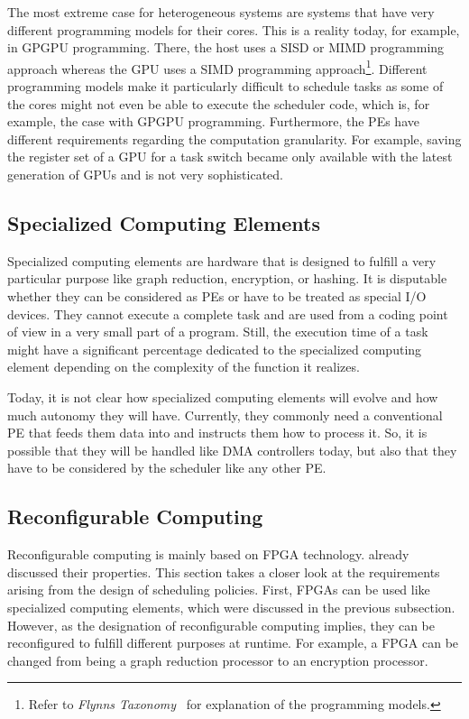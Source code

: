 The most extreme case for heterogeneous systems are systems that have very different programming models for their cores. This is a reality today, for example, in \ac{GPGPU} programming. There, the host uses a \ac{SISD} or \ac{MIMD} programming approach whereas the \ac{GPU} uses a \ac{SIMD} programming approach\footnote{Refer to \textit{Flynns Taxonomy}~\cite{Flynn-1972-taxonomy} for explanation of the programming models.}. Different programming models make it particularly difficult to schedule tasks as some of the cores might not even be able to execute the scheduler code, which is, for example, the case with \ac{GPGPU} programming. Furthermore, the \acp{PE} have different requirements regarding the computation granularity. For example, saving the register set of a \ac{GPU} for a task switch became only available with the latest generation of \acp{GPU} and is not very sophisticated.

\subsection{Specialized Computing Elements}

Specialized computing elements are hardware that is designed to fulfill a very particular purpose like graph reduction, encryption, or hashing. It is disputable whether they can be considered as \acp{PE} or have to be treated as special I/O devices. They cannot execute a complete task and are used from a coding point of view in a very small part of a program. Still, the execution time of a task might have a significant percentage dedicated to the specialized computing element depending on the complexity of the function it realizes.

Today, it is not clear how specialized computing elements will evolve and how much autonomy they will have. Currently, they commonly need a conventional \ac{PE} that feeds them data into and instructs them how to process it. So, it is possible that they will be handled like \ac{DMA} controllers today, but also that they have to be considered by the scheduler like any other \ac{PE}.

\subsection{Reconfigurable Computing}%
\label{sec:analysis:environment:reconf}

Reconfigurable computing is mainly based on \ac{FPGA} technology.  already discussed their properties. This section takes a closer look at the requirements arising from the design of scheduling policies. First, \acp{FPGA} can be used like specialized computing elements, which were discussed in the previous subsection. However, as the designation of reconfigurable computing implies, they can be reconfigured to fulfill different purposes at runtime. For example, a \ac{FPGA} can be changed from being a graph reduction processor to an encryption processor.

